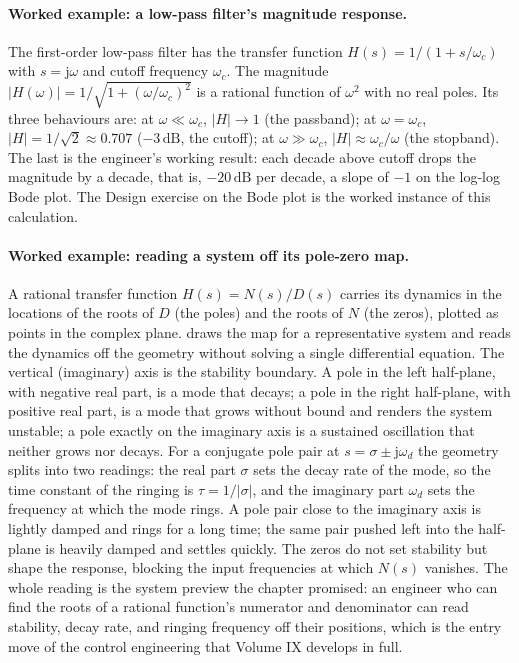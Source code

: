 \paragraph{Worked example: a low-pass filter's magnitude response.}
The first-order low-pass filter has the transfer function
$H(s) = 1/(1 + s/\omega_{c})$ with $s = \mathrm{j}\omega$ and cutoff
frequency $\omega_{c}$. The magnitude $|H(\omega)| = 1/\sqrt{1 +
(\omega/\omega_{c})^{2}}$ is a rational function of $\omega^{2}$
with no real poles. Its three behaviours are: at $\omega \ll
\omega_{c}$, $|H| \to 1$ (the passband); at $\omega = \omega_{c}$,
$|H| = 1/\sqrt{2} \approx 0.707$ ($-3\,\si{\deci\bel}$, the cutoff);
at $\omega \gg \omega_{c}$, $|H| \approx \omega_{c}/\omega$ (the
stopband). The last is the engineer's working result: each decade
above cutoff drops the magnitude by a decade, that is,
$-20\,\si{\deci\bel}$ per decade, a slope of $-1$ on the log-log
Bode plot. The Design exercise on the Bode plot is the worked
instance of this calculation.

\paragraph{Worked example: reading a system off its pole-zero map.}
A rational transfer function $H(s) = N(s)/D(s)$ carries its dynamics
in the locations of the roots of $D$ (the poles) and the roots of $N$
(the zeros), plotted as points in the complex plane.
 draws the map for a representative
system and reads the dynamics off the geometry without solving a
single differential equation. The vertical (imaginary) axis is the
stability boundary. A pole in the left half-plane, with negative real
part, is a mode that decays; a pole in the right half-plane, with
positive real part, is a mode that grows without bound and renders the
system unstable; a pole exactly on the imaginary axis is a sustained
oscillation that neither grows nor decays. For a conjugate pole pair
at $s = \sigma \pm \mathrm{j}\omega_{d}$ the geometry splits into two
readings: the real part $\sigma$ sets the decay rate of the mode, so
the time constant of the ringing is $\tau = 1/|\sigma|$, and the
imaginary part $\omega_{d}$ sets the frequency at which the mode rings.
A pole pair close to the imaginary axis is lightly damped and rings for
a long time; the same pair pushed left into the half-plane is heavily
damped and settles quickly. The zeros do not set stability but shape
the response, blocking the input frequencies at which $N(s)$ vanishes.
The whole reading is the system preview the chapter promised: an
engineer who can find the roots of a rational function's numerator and
denominator can read stability, decay rate, and ringing frequency off
their positions, which is the entry move of the control engineering
that Volume IX develops in full.

